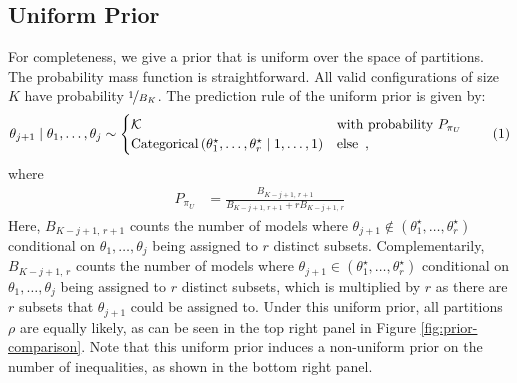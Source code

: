 \documentclass[11pt,a4paper]{article}
\theoremstyle{definition} %
\theoremstyle{case}
\newcommand{\bellnum}[1]{B_{#1}}
\newcommand{\rbellnum}[2]{B_{#1,\,#2}}
\newcommand{\len}{r} %
\newcommand{\numberthis}{\addtocounter{equation}{1}\tag{\theequation}}
\newcommand{\FD}[1]{\textcolor{red}{Fabian: #1 }}
\begin{document}
\subsection{Uniform Prior}
For completeness, we give a prior that is uniform over the space of partitions. The probability mass function is straightforward. All valid configurations of size $K$ have probability $\nicefrac{1}{\bellnum{K}}$. The prediction rule of the uniform prior is given by:
\begin{equation}
    \theta_{j + 1} \mid \theta_1, \ldots, \theta_j%
    \sim \begin{cases}
    \mathcal{K} & \text{with probability } P_{\pi_{U}} \\
    \text{Categorical}\left(\theta_1^{\star}, \ldots, \theta_\len^{\star} \mid 1, \ldots, 1\right) & \text{else} \enspace ,
    \end{cases} \numberthis
\end{equation}
where
\begin{align}
    P_{\pi_{U}} %
    &=
    \frac{\rbellnum{K-j+1}{\len + 1}}{\rbellnum{K-j+1}{\len + 1} + \len\rbellnum{K-j+1}{\len}}
\end{align}
Here, $\rbellnum{K-j+1}{\len + 1}$ counts the number of models where $\theta_{j+1} \notin \left(\theta_1^{\star}, \ldots, \theta_\len^{\star}\right)$ conditional on $\theta_1, \ldots, \theta_j$ being assigned to $\len$ distinct subsets.
Complementarily, $\rbellnum{K-j+1}{\len}$ counts the number of models where $\theta_{j+1} \in \left(\theta_1^{\star}, \ldots, \theta_\len^{\star}\right)$ conditional on $\theta_1, \ldots, \theta_j$ being assigned to $\len$ distinct subsets, which is multiplied by $\len$ as there are $\len$ subsets that $\theta_{j+1}$ could be assigned to. Under this uniform prior, all partitions $\rho$ are equally likely, as can be seen in the top right panel in Figure \ref{fig:prior-comparison}. Note that this uniform prior induces a non-uniform prior on the number of inequalities, as shown in the bottom right panel.
\end{document}
